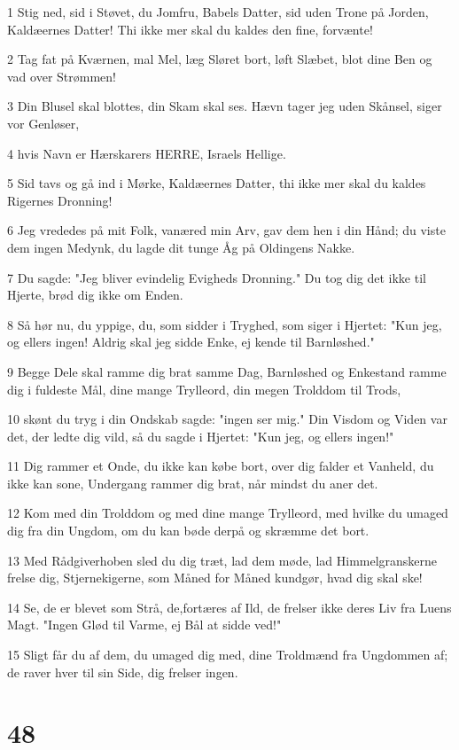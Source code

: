\par 1 Stig ned, sid i Støvet, du Jomfru, Babels Datter, sid uden Trone på Jorden, Kaldæernes Datter! Thi ikke mer skal du kaldes den fine, forvænte!
\par 2 Tag fat på Kværnen, mal Mel, læg Sløret bort, løft Slæbet, blot dine Ben og vad over Strømmen!
\par 3 Din Blusel skal blottes, din Skam skal ses. Hævn tager jeg uden Skånsel, siger vor Genløser,
\par 4 hvis Navn er Hærskarers HERRE, Israels Hellige.
\par 5 Sid tavs og gå ind i Mørke, Kaldæernes Datter, thi ikke mer skal du kaldes Rigernes Dronning!
\par 6 Jeg vrededes på mit Folk, vanæred min Arv, gav dem hen i din Hånd; du viste dem ingen Medynk, du lagde dit tunge Åg på Oldingens Nakke.
\par 7 Du sagde: "Jeg bliver evindelig Evigheds Dronning." Du tog dig det ikke til Hjerte, brød dig ikke om Enden.
\par 8 Så hør nu, du yppige, du, som sidder i Tryghed, som siger i Hjertet: "Kun jeg, og ellers ingen! Aldrig skal jeg sidde Enke, ej kende til Barnløshed."
\par 9 Begge Dele skal ramme dig brat samme Dag, Barnløshed og Enkestand ramme dig i fuldeste Mål, dine mange Trylleord, din megen Trolddom til Trods,
\par 10 skønt du tryg i din Ondskab sagde: "ingen ser mig." Din Visdom og Viden var det, der ledte dig vild, så du sagde i Hjertet: "Kun jeg, og ellers ingen!"
\par 11 Dig rammer et Onde, du ikke kan købe bort, over dig falder et Vanheld, du ikke kan sone, Undergang rammer dig brat, når mindst du aner det.
\par 12 Kom med din Trolddom og med dine mange Trylleord, med hvilke du umaged dig fra din Ungdom, om du kan bøde derpå og skræmme det bort.
\par 13 Med Rådgiverhoben sled du dig træt, lad dem møde, lad Himmelgranskerne frelse dig, Stjernekigerne, som Måned for Måned kundgør, hvad dig skal ske!
\par 14 Se, de er blevet som Strå, de,fortæres af Ild, de frelser ikke deres Liv fra Luens Magt. "Ingen Glød til Varme, ej Bål at sidde ved!"
\par 15 Sligt får du af dem, du umaged dig med, dine Troldmænd fra Ungdommen af; de raver hver til sin Side, dig frelser ingen.

\chapter{48}


